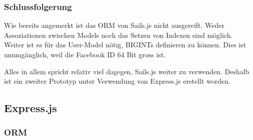 \subsubsection*{Schlussfolgerung}

Wie bereits angemerkt ist das ORM von Sails.js nicht ausgereift. Weder Assoziationen zwischen Models noch das Setzen von Indexen sind möglich.\\
Weiter ist es für das User-Model nötig, BIGINTs definieren zu können. Dies ist unumgänglich, weil die Facebook ID 64 Bit gross ist.

Alles in allem spricht relativ viel dagegen, Sails.js weiter zu verwenden. Deshalb ist ein zweiter Prototyp unter Verwendung von Express.js erstellt worden.

\subsection*{Express.js}

\subsubsection*{\gls{ORM}}
